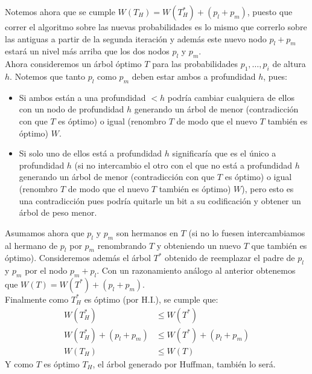 \documentclass[dcc,uchile]{fcfmcourse}
\begin{document}
\begin{enumerate}[a)]
    Notemos ahora que se cumple $W(T_{H}) = W(T_{H}^*) + (p_{l}+p_{m})$, puesto que correr el algoritmo sobre las nuevas probabilidades es lo mismo que correrlo sobre las antiguas a partir de la segunda iteración y además este nuevo nodo $p_{l}+p_{m}$ estará un nivel más arriba que los dos nodos $p_{l}$ y $p_{m}$.\\
    
    Ahora consideremos un árbol óptimo $T$ para las probabilidades  $p_{1},\ldots,p_{i}$ de altura $h$. Notemos que tanto $p_{l}$ como $p_{m}$ deben estar ambos a profundidad $h$, pues:
    \begin{itemize}
        \item Si ambos están a una profundidad $<h$ podría cambiar cualquiera de ellos con un nodo de profundidad $h$ generando un árbol de menor (contradicción con que $T$ es óptimo) o igual (renombro $T$ de modo que el nuevo $T$ también es óptimo) $W$.
        \item Si solo uno de ellos está a profundidad $h$ significaría que es el único a profundidad $h$ (si no intercambio el otro con el que no está a profundidad $h$ generando un árbol de menor (contradicción con que $T$ es óptimo) o igual (renombro $T$ de modo que el nuevo $T$ también es óptimo) $W$), pero esto es una contradicción pues podría quitarle un bit a su codificación y obtener un árbol de peso menor.
    \end{itemize}
    
    Asumamos ahora que $p_{l}$ y $p_{m}$ son hermanos en $T$ (si no lo fuesen intercambiamos al hermano de $p_{l}$ por $p_{m}$ renombrando $T$ y obteniendo un nuevo $T$ que también es óptimo). Consideremos además el árbol $T^*$ obtenido de reemplazar el padre de $p_{l}$ y $p_{m}$ por el nodo $p_{m}+p_{l}$. Con un razonamiento análogo al anterior obtenemos que $W(T) = W(T^*) + (p_{l}+p_{m})$.\\
    
    Finalmente como $T_H^*$ es óptimo (por H.I.), se cumple que:
    \begin{align*}
        W(T_H^*) &\le W(T^*) \\
        W(T_H^*) + (p_{l}+p_{m}) &\le W(T^*) + (p_{l}+p_{m})\\
        W(T_H) &\le W(T)
    \end{align*}
    Y como $T$ es óptimo $T_H$, el árbol generado por Huffman, también lo será.
\end{enumerate}
\end{document}
